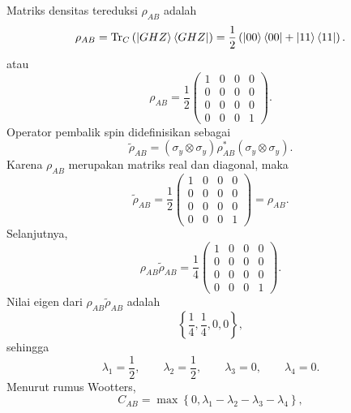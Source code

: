 Matriks densitas tereduksi $\rho_{AB}$ adalah
\begin{equation}
	\rho_{AB}
	=
	\mathrm{Tr}_C
	\left(
	\ket{GHZ}\bra{GHZ}
	\right)
	=
	\frac{1}{2}
	\left(
	\ket{00}\bra{00}
	+
	\ket{11}\bra{11}
	\right).
\end{equation}
atau
\begin{equation}
	\rho_{AB}
	=
	\frac{1}{2}
	\begin{pmatrix}
		1 & 0 & 0 & 0\\
		0 & 0 & 0 & 0\\
		0 & 0 & 0 & 0\\
		0 & 0 & 0 & 1
	\end{pmatrix}.
\end{equation}
Operator pembalik spin didefinisikan sebagai
\begin{equation}
	\tilde{\rho}_{AB}
	=
	(\sigma_y\otimes\sigma_y)
	\rho_{AB}^{*}
	(\sigma_y\otimes\sigma_y).
\end{equation}
Karena \(\rho_{AB}\) merupakan matriks real dan diagonal, maka
\begin{equation}
	\tilde{\rho}_{AB}
	=
	\frac{1}{2}
	\begin{pmatrix}
		1 & 0 & 0 & 0\\
		0 & 0 & 0 & 0\\
		0 & 0 & 0 & 0\\
		0 & 0 & 0 & 1
	\end{pmatrix}
	=
	\rho_{AB}.
\end{equation}
Selanjutnya,
\begin{equation}
	\rho_{AB}\tilde{\rho}_{AB}
	=
	\frac{1}{4}
	\begin{pmatrix}
		1 & 0 & 0 & 0\\
		0 & 0 & 0 & 0\\
		0 & 0 & 0 & 0\\
		0 & 0 & 0 & 1
	\end{pmatrix}.
\end{equation}
Nilai eigen dari
\(\rho_{AB}\tilde{\rho}_{AB}\)
adalah
\begin{equation}
	\left\{
	\frac{1}{4},
	\frac{1}{4},
	0,
	0
	\right\},
\end{equation}
sehingga
\begin{equation}
	\lambda_1=\frac{1}{2},\qquad
	\lambda_2=\frac{1}{2},\qquad
	\lambda_3=0,\qquad
	\lambda_4=0.
\end{equation}
Menurut rumus Wootters,
\begin{equation}
	C_{AB}
	=
	\max
	\left\{
	0,
	\lambda_1-\lambda_2-\lambda_3-\lambda_4
	\right\},
\end{equation}
